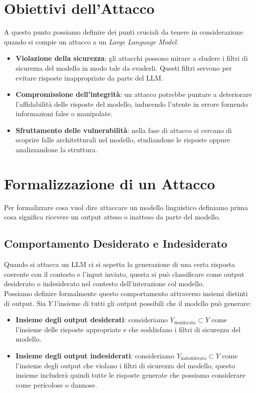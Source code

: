 \section{Obiettivi dell'Attacco}
A questo punto possiamo definire dei punti cruciali da tenere in considerazione quando si compie un attacco a un \emph{Large Language Model}:
\begin{itemize}
    \item \textbf{Violazione della sicurezza}: gli attacchi possono mirare a eludere i filtri di sicurezza del modello in modo tale da evaderli. Questi filtri servono per evitare risposte inappropriate da parte del LLM.
    \item \textbf{Compromissione dell'integrit\`a}: un attacco potrebbe puntare a deteriorare l'affidabilit\`a delle risposte del modello, inducendo l'utente in errore fornendo informazioni false o manipolate.
    \item \textbf{Sfruttamento delle vulnerabilit\`a}: nella fase di attacco si cercano di scoprire falle architetturali nel modello, studiandone le risposte oppure analizzandone la struttura.
\end{itemize}

\section{Formalizzazione di un Attacco}
Per formalizzare cosa vuol dire attaccare un modello linguistico definiamo prima cosa significa ricevere un output atteso o inatteso da parte del modello.
\subsection{Comportamento Desiderato e Indesiderato}
Quando si attacca un LLM ci si aspetta la generazione di una certa risposta coerente con il contesto e l'input inviato, questa si pu\`o classificare come output desiderato o indesiderato nel contesto dell'interazione col modello.\\
Possiamo definire formalmente questo comportamento attraverso insiemi distinti di output. Sia \(Y\) l'insieme di tutti gli output possibili che il modello pu\`o generare:
\begin{itemize}
    \item \textbf{Insieme degli output desiderati}: consideriamo \(Y_\text{desiderato} \subset Y\) come l'insieme delle risposte appropriate e che soddisfano i filtri di sicurezza del modello.
    \item \textbf{Insieme degli output indesiderati}: consideriamo \(Y_\text{indesiderato} \subset Y\) come l'insieme degli output che violano i filtri di sicurezza del modello, questo insieme includer\`a quindi tutte le risposte generate che possiamo considerare come pericolose o dannose.
\end{itemize}

